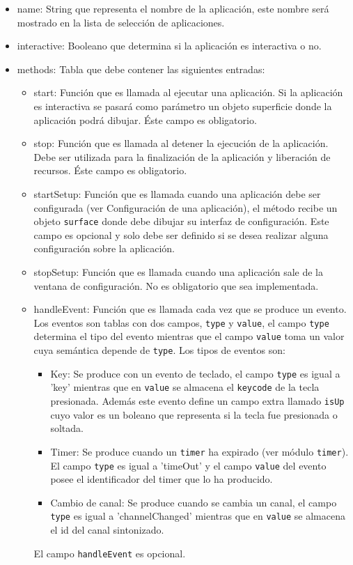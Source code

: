 \begin{itemize}
	\item name: String que representa el nombre de la aplicación, este nombre será mostrado en la lista de selección de aplicaciones.
	\item interactive: Booleano que determina si la aplicación es interactiva o no.
	\item methods: Tabla que debe contener las siguientes entradas:
	\begin{itemize}
		\item start: Función que es llamada al ejecutar una aplicación. Si la aplicación es interactiva se pasará como parámetro un objeto superficie donde la aplicación podrá dibujar. Éste campo es obligatorio.
		\item stop: Función que es llamada al detener la ejecución de la aplicación. Debe ser utilizada para la finalizaci\'on de la aplicación y liberación de recursos.  Éste campo es obligatorio.
		\item startSetup: Función que es llamada cuando una aplicación debe ser configurada (ver Configuración de una aplicación), el método recibe un objeto \texttt{surface} donde debe dibujar su interfaz de configuración. Este campo es opcional y solo debe ser definido si se desea realizar alguna configuración sobre la aplicaci\'on.
		\item stopSetup: Función que es llamada cuando una aplicación sale de la ventana de configuración. No es obligatorio que sea implementada.
		\item handleEvent: Función que es llamada cada vez que se produce un evento. Los eventos son tablas con dos campos, \texttt{type} y \texttt{value}, el campo \texttt{type} determina el tipo del evento mientras que el campo \texttt{value} toma un valor cuya semántica depende de \texttt{type}. Los tipos de eventos son:
		\begin{itemize}
			\item Key: Se produce con un evento de teclado, el campo \texttt{type} es igual a 'key' mientras que en \texttt{value} se almacena el \texttt{keycode} de la tecla presionada. Además este evento define un campo extra llamado \texttt{isUp} cuyo valor es un boleano que representa si la tecla fue presionada o soltada.
			\item Timer: Se produce cuando un \texttt{timer} ha expirado (ver módulo \texttt{timer}). El campo \texttt{type} es igual a 'timeOut' y el campo \texttt{value} del evento posee el identificador del timer que lo ha producido.
			\item Cambio de canal: Se produce cuando se cambia un canal, el campo \texttt{type} es igual a \mbox{'channelChanged'} mientras que en \texttt{value} se almacena el id del canal sintonizado.
		\end{itemize}
		El campo  \texttt{handleEvent} es opcional.
	\end{itemize}
\end{itemize}


